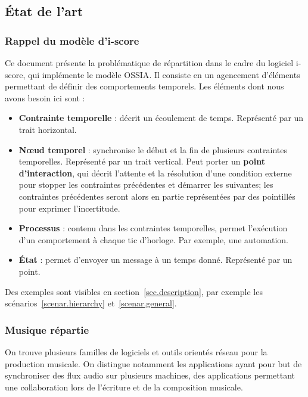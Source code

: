 \documentclass{article}
\newcommand\trigger{point d'interaction\xspace}
\newcommand\vocab[1]{\textbf{#1}}
\begin{document}

\subsection{État de l'art}
\subsubsection{Rappel du modèle d'i-score}
Ce document présente la problématique de répartition dans le cadre du logiciel i-score, qui implémente le modèle OSSIA\cite{celerier2015ossia}.
Il consiste en un agencement d'éléments permettant de définir des comportements temporels. 
Les éléments dont nous avons besoin ici sont : 
\begin{itemize}
    \item \vocab{Contrainte temporelle} : décrit un écoulement de temps. Représenté par un trait horizontal.
    \item \vocab{Nœud temporel} : synchronise le début et la fin de plusieurs contraintes temporelles. Représenté par un trait vertical.
    Peut porter un \vocab{point d'interaction}, qui décrit l'attente et la résolution d'une condition externe pour stopper les contraintes précédentes et démarrer les suivantes; les contraintes précédentes seront alors en partie représentées par des pointillés pour exprimer l'incertitude.
    \item \vocab{Processus} : contenu dans les contraintes temporelles, permet l'exécution d'un comportement à chaque tic d'horloge. Par exemple, une automation.
    \item \vocab{État} : permet d'envoyer un message à un temps donné. Représenté par un point.
\end{itemize}
Des exemples sont visibles en section~\ref{sec.description}, par exemple les scénarios~\ref{scenar.hierarchy} et~\ref{scenar.general}.
\subsubsection{Musique répartie}
On trouve plusieurs familles de logiciels et outils orientés réseau pour la production musicale.
On distingue notamment les applications ayant pour but de synchroniser des 
flux audio sur plusieurs machines, des applications permettant une collaboration lors 
de l'écriture et de la composition musicale.
\end{document}
